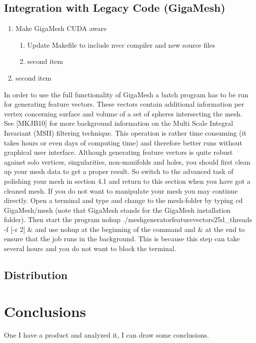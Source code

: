 \documentclass{article}
\begin{document}
\subsection{Integration with Legacy Code (GigaMesh)}
\begin{enumerate}
\item Make GigaMesh CUDA aware
	\begin{enumerate}
	\item Update Makefile to include nvcc compiler and new source files
	\item second item
	\end{enumerate}
\item second item
\end{enumerate}
In order to use the full functionality of GigaMesh a batch program has to be run for generating feature vectors. These vectors contain additional information per vertex concerning surface and volume of a set of spheres intersecting the mesh. See [MKJB10] for more background information on the Multi Scale Integral Invariant (MSII) filtering technique. This operation is rather time consuming (it takes hours or even days of computing time) and therefore better runs without graphical user interface. Although generating feature vectors is quite robust against solo vertices, singularities, non-manifolds and holes, you should first clean up your mesh data to get a proper result. So switch to the advanced task of polishing your mesh in section 4.1 and return to this section when you have got a cleaned mesh. If you do not want to manipulate your mesh you may continue directly. Open a terminal and type and change to the mesh-folder by typing cd GigaMesh/mesh (note that GigaMesh stands for the GigaMesh installation folder). Then start the program 
nohup ./meshgeneratorfeaturevectors25d\_threads -f [-r 2] \& 
and use nohup at the beginning of the command and \& at the end to ensure that the job runs in the background. This is because this step can take several hours and you do not want to block the terminal.~\cite[p.~19]{Giga17}
\subsection{Distribution}
\section{Conclusions}
One I have a product and analyzed it, I can draw some conclusions.
\printindex
\listoffigures
{}

\end{document}
